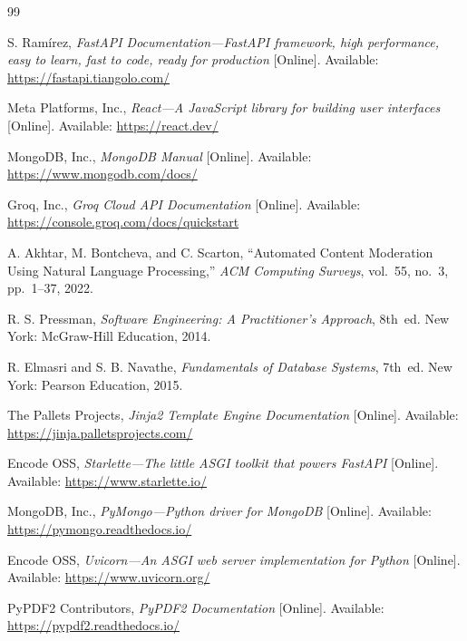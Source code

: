 \documentclass{sgcproject}
\begin{document}
\begin{thebibliography}{99}

S. Ram\'{i}rez, \textit{FastAPI Documentation---FastAPI framework, high performance, easy to learn, fast to code, ready for production} [Online]. Available: \url{https://fastapi.tiangolo.com/}

Meta Platforms, Inc., \textit{React---A JavaScript library for building user interfaces} [Online]. Available: \url{https://react.dev/}

MongoDB, Inc., \textit{MongoDB Manual} [Online]. Available: \url{https://www.mongodb.com/docs/}

Groq, Inc., \textit{Groq Cloud API Documentation} [Online]. Available: \url{https://console.groq.com/docs/quickstart}

A. Akhtar, M. Bontcheva, and C. Scarton, ``Automated Content Moderation Using Natural Language Processing,'' \textit{ACM Computing Surveys}, vol.~55, no.~3, pp.~1--37, 2022.

R. S. Pressman, \textit{Software Engineering: A Practitioner's Approach}, 8th~ed. New York: McGraw-Hill Education, 2014.

R. Elmasri and S. B. Navathe, \textit{Fundamentals of Database Systems}, 7th~ed. New York: Pearson Education, 2015.

The Pallets Projects, \textit{Jinja2 Template Engine Documentation} [Online]. Available: \url{https://jinja.palletsprojects.com/}

Encode OSS, \textit{Starlette---The little ASGI toolkit that powers FastAPI} [Online]. Available: \url{https://www.starlette.io/}

MongoDB, Inc., \textit{PyMongo---Python driver for MongoDB} [Online]. Available: \url{https://pymongo.readthedocs.io/}

Encode OSS, \textit{Uvicorn---An ASGI web server implementation for Python} [Online]. Available: \url{https://www.uvicorn.org/}

PyPDF2 Contributors, \textit{PyPDF2 Documentation} [Online]. Available: \url{https://pypdf2.readthedocs.io/}

\end{thebibliography}
\end{document}
